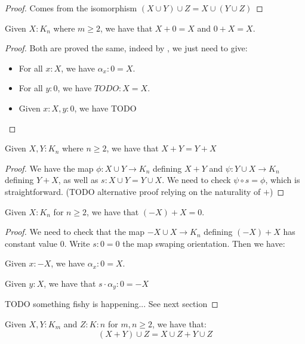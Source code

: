 \begin{proof}
Comes from the isomorphism $(X\cup Y) \cup Z = X\cup (Y\cup Z)$
\end{proof}

\begin{lemma}
Given $X:K_{n}$ where $m\geq 2$, we have that $X+0 = X$ and $0+X=X$.
\end{lemma}

\begin{proof}
Both are proved the same, indeed by , we just need to give:
\begin{itemize}
\item For all $x:X$, we have $\alpha_x : 0=X$.
\item For all $y:0$, we have $TODO : X=X$.
\item Given $x:X,y:0$, we have TODO
\end{itemize}
\end{proof}

\begin{lemma}
Given $X,Y:K_{n}$ where $n\geq 2$, we have that $X+Y = Y+X$
\end{lemma}

\begin{proof}
We have the map $\phi : X\cup Y\to K_n$ defining $X+Y$ and $\psi:Y\cup X\to K_n$ defining $Y+X$, as well as $s:X\cup Y = Y\cup X$. We need to check $\psi\circ s = \phi$, which is straightforward. (TODO alternative proof relying on the naturality of $+$)
\end{proof}

\begin{lemma}
Given $X:K_n$ for $n\geq 2$, we have that $(-X)+X = 0$.
\end{lemma}

\begin{proof}
We need to check that the map $-X\cup X \to K_n$ defining $(-X)+X$ has constant value $0$. Write $s : 0 = 0$ the map swaping orientation. Then we have:

Given $x:-X$, we have $\alpha_x:0=X$.

Given $y:X$, we have that $s\cdot \alpha_y:0=-X$

TODO something fishy is happening... See next section
\end{proof}

\begin{lemma}
Given $X,Y:K_m$ and $Z:K:n$ for $m,n\geq 2$, we have that:
\[(X+Y)\cup Z = X\cup Z + Y\cup Z\]
\end{lemma}

